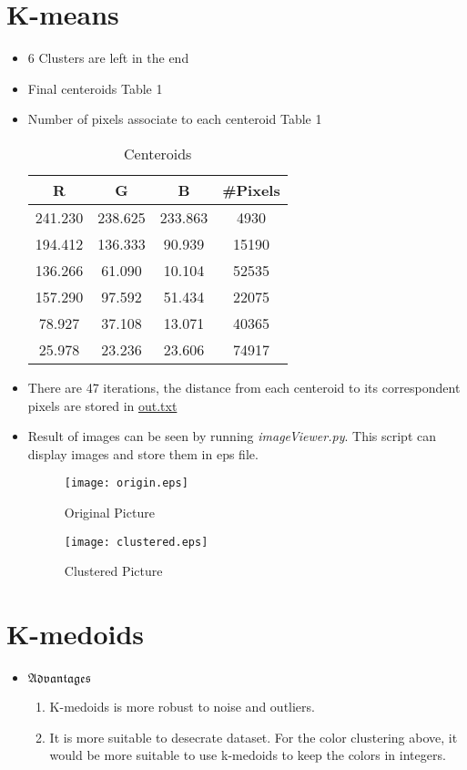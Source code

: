 \documentclass[a4paper, 10pt, titlepage]{article}
\begin{document}
\begin{enumerate}
\section{K-means}
    \begin{itemize}
        \item 6 Clusters are left in the end
        \item Final centeroids Table 1
        \item Number of pixels associate to each centeroid Table 1
            \begin{table}[H]
            \center
            \begin{tabular}{cccc}
            R       & G       & B       & \#Pixels \\ \hline
            241.230 & 238.625 & 233.863 & 4930    \\
            194.412 & 136.333 & 90.939  & 15190   \\
            136.266 & 61.090  & 10.104  & 52535   \\
            157.290 & 97.592  & 51.434  & 22075   \\
            78.927  & 37.108  & 13.071  & 40365   \\
            25.978  & 23.236  & 23.606  & 74917   \\
            \end{tabular}
            \label{pixel}
            \caption{Centeroids}
        \end{table}
    \item There are 47 iterations, the distance from each centeroid to its correspondent pixels are stored in \href{./out.txt}{out.txt}
    \item Result of images can be seen by running \emph{imageViewer.py}. This script can display images and store them in eps file.
        \begin{figure}[H]
    \begin{minipage}{0.49\linewidth}
            \texttt{[image: origin.eps]}
      \caption{Original Picture}\label{fig:left}
    \end{minipage}
    \hfill
    \begin{minipage}{0.49\linewidth}
            \texttt{[image: clustered.eps]}
      \caption{Clustered Picture}\label{fig:right}
    \end{minipage}
  \end{figure}
    \end{itemize}
\section{K-medoids}
\begin{itemize}
    \item $\mathfrak{Advantages}$
        \begin{enumerate}
            \item K-medoids is more robust to noise and outliers.
            \item It is more suitable to desecrate dataset. For the color clustering above, it would be more suitable to use k-medoids to keep the colors in integers. 


\end{enumerate}
\end{itemize}
\end{enumerate}
\end{document}
